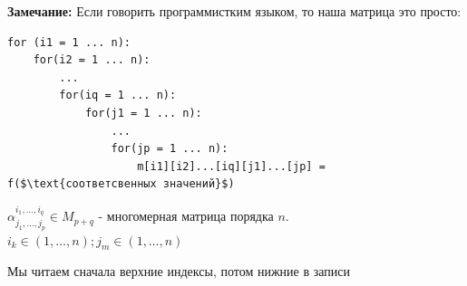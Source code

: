 \textbf{Замечание:} Если говорить программистким языком, то наша матрица это просто:

\begin{lstlisting}[mathescape]
for (i1 = 1 ... n):
    for(i2 = 1 ... n):
        ...
        for(iq = 1 ... n):
            for(j1 = 1 ... n):
                ...
                for(jp = 1 ... n):
                    m[i1][i2]...[iq][j1]...[jp] = f($\text{соответсвенных значений}$)
\end{lstlisting}


$\alpha^{i_1,\ldots,i_q}_{j_1,\ldots, j_p} \in M_{p+q}$ - многомерная матрица порядка $n$. $i_k \in (1,\ldots,n); j_m \in (1,\ldots, n)$

Мы читаем сначала верхние индексы, потом нижние в записи

